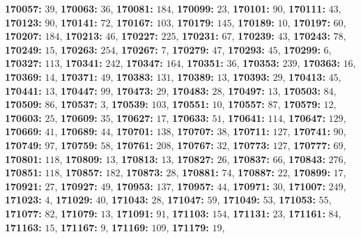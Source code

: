 \textsf{\bfseries 170057:} $39$, \textsf{\bfseries 170063:} $36$, \textsf{\bfseries 170081:} $184$, \textsf{\bfseries 170099:} $23$, \textsf{\bfseries 170101:} $90$, \textsf{\bfseries 170111:} $43$, \textsf{\bfseries 170123:} $90$, \textsf{\bfseries 170141:} $72$, \textsf{\bfseries 170167:} $103$, \textsf{\bfseries 170179:} $145$, \textsf{\bfseries 170189:} $10$, \textsf{\bfseries 170197:} $60$, \textsf{\bfseries 170207:} $184$, \textsf{\bfseries 170213:} $46$, \textsf{\bfseries 170227:} $225$, \textsf{\bfseries 170231:} $67$, \textsf{\bfseries 170239:} $43$, \textsf{\bfseries 170243:} $78$, \textsf{\bfseries 170249:} $15$, \textsf{\bfseries 170263:} $254$, \textsf{\bfseries 170267:} $7$, \textsf{\bfseries 170279:} $47$, \textsf{\bfseries 170293:} $45$, \textsf{\bfseries 170299:} $6$, \textsf{\bfseries 170327:} $113$, \textsf{\bfseries 170341:} $242$, \textsf{\bfseries 170347:} $164$, \textsf{\bfseries 170351:} $36$, \textsf{\bfseries 170353:} $239$, \textsf{\bfseries 170363:} $16$, \textsf{\bfseries 170369:} $14$, \textsf{\bfseries 170371:} $49$, \textsf{\bfseries 170383:} $131$, \textsf{\bfseries 170389:} $13$, \textsf{\bfseries 170393:} $29$, \textsf{\bfseries 170413:} $45$, \textsf{\bfseries 170441:} $13$, \textsf{\bfseries 170447:} $99$, \textsf{\bfseries 170473:} $29$, \textsf{\bfseries 170483:} $28$, \textsf{\bfseries 170497:} $13$, \textsf{\bfseries 170503:} $84$, \textsf{\bfseries 170509:} $86$, \textsf{\bfseries 170537:} $3$, \textsf{\bfseries 170539:} $103$, \textsf{\bfseries 170551:} $10$, \textsf{\bfseries 170557:} $87$, \textsf{\bfseries 170579:} $12$, \textsf{\bfseries 170603:} $25$, \textsf{\bfseries 170609:} $35$, \textsf{\bfseries 170627:} $17$, \textsf{\bfseries 170633:} $51$, \textsf{\bfseries 170641:} $114$, \textsf{\bfseries 170647:} $129$, \textsf{\bfseries 170669:} $41$, \textsf{\bfseries 170689:} $44$, \textsf{\bfseries 170701:} $138$, \textsf{\bfseries 170707:} $38$, \textsf{\bfseries 170711:} $127$, \textsf{\bfseries 170741:} $90$, \textsf{\bfseries 170749:} $97$, \textsf{\bfseries 170759:} $58$, \textsf{\bfseries 170761:} $208$, \textsf{\bfseries 170767:} $32$, \textsf{\bfseries 170773:} $127$, \textsf{\bfseries 170777:} $69$, \textsf{\bfseries 170801:} $118$, \textsf{\bfseries 170809:} $13$, \textsf{\bfseries 170813:} $13$, \textsf{\bfseries 170827:} $26$, \textsf{\bfseries 170837:} $66$, \textsf{\bfseries 170843:} $276$, \textsf{\bfseries 170851:} $118$, \textsf{\bfseries 170857:} $182$, \textsf{\bfseries 170873:} $28$, \textsf{\bfseries 170881:} $74$, \textsf{\bfseries 170887:} $22$, \textsf{\bfseries 170899:} $17$, \textsf{\bfseries 170921:} $27$, \textsf{\bfseries 170927:} $49$, \textsf{\bfseries 170953:} $137$, \textsf{\bfseries 170957:} $44$, \textsf{\bfseries 170971:} $30$, \textsf{\bfseries 171007:} $249$, \textsf{\bfseries 171023:} $4$, \textsf{\bfseries 171029:} $40$, \textsf{\bfseries 171043:} $28$, \textsf{\bfseries 171047:} $59$, \textsf{\bfseries 171049:} $53$, \textsf{\bfseries 171053:} $55$, \textsf{\bfseries 171077:} $82$, \textsf{\bfseries 171079:} $13$, \textsf{\bfseries 171091:} $91$, \textsf{\bfseries 171103:} $154$, \textsf{\bfseries 171131:} $23$, \textsf{\bfseries 171161:} $84$, \textsf{\bfseries 171163:} $15$, \textsf{\bfseries 171167:} $9$, \textsf{\bfseries 171169:} $109$, \textsf{\bfseries 171179:} $19$, 
